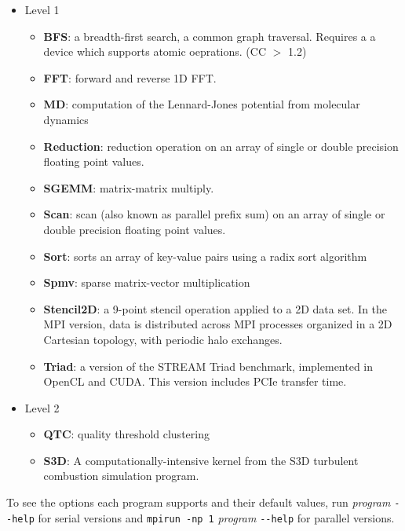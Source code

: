 \documentclass[11pt]{article}
\begin{document}
\begin{itemize}
\item Level 1
    \begin{itemize}
        \item {\bf BFS}: a breadth-first search, a common graph traversal. Requires a
		a device which supports atomic oeprations. (CC $>$ 1.2)
        \item {\bf FFT}: forward and reverse 1D FFT.
        \item {\bf MD}: computation of the Lennard-Jones potential from molecular dynamics
        \item {\bf Reduction}: reduction operation on an array of single
        or double precision floating point values.
        \item {\bf SGEMM}: matrix-matrix multiply.
        \item {\bf Scan}: scan (also known as parallel prefix sum) on an array 
        of single or double precision floating point values.
        \item {\bf Sort}: sorts an array of key-value pairs using a radix sort 
        algorithm
        \item {\bf Spmv}: sparse matrix-vector multiplication
        \item {\bf Stencil2D}: a 9-point stencil operation applied to a 2D data
        set. In the MPI version, data is distributed across MPI processes
        organized in a 2D Cartesian topology, with periodic halo exchanges.
        \item {\bf Triad}: a version of the STREAM Triad benchmark, implemented 
        in OpenCL and CUDA. This version includes PCIe transfer time.
    \end{itemize}
\item{Level 2}
    \begin{itemize}
        \item {\bf QTC}: quality threshold clustering
        \item {\bf S3D}: A computationally-intensive kernel from the 
        S3D turbulent combustion simulation program\cite{s3d}.
    \end{itemize}
\end{itemize}
    
To see the options each program supports and their default values, run 
{\it program} \verb+--help+ for serial versions and \verb+mpirun -np 1+ {\it program} \verb+--help+
for parallel versions.
\end{document}
